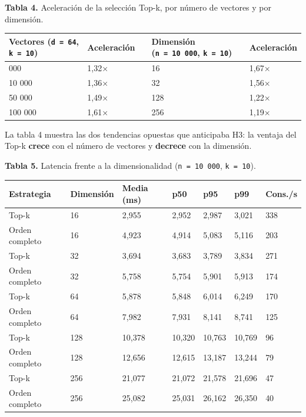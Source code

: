 \documentclass[11pt,a4paper]{article}
\begin{document}
\textbf{Tabla 4.} Aceleración de la selección Top-k, por número de
vectores y por dimensión.

\begin{longtable}[]{@{}C{0.21\textwidth}C{0.14\textwidth}C{0.03\textwidth}C{0.25\textwidth}C{0.14\textwidth}@{}}
\toprule\noalign{}
Vectores (\texttt{d\ =\ 64}, \texttt{k\ =\ 10}) & Aceleración & &
Dimensión (\texttt{n\ =\ 10\ 000}, \texttt{k\ =\ 10}) & Aceleración \\
\midrule\noalign{}
\endhead
\bottomrule\noalign{}
 000 & 1,32× & & 16 & 1,67× \\
10 000 & 1,36× & & 32 & 1,56× \\
50 000 & 1,49× & & 128 & 1,22× \\
100 000 & 1,61× & & 256 & 1,19× \\
\end{longtable}

La tabla 4 muestra las dos tendencias opuestas que anticipaba H3: la
ventaja del Top-k \textbf{crece} con el número de vectores y
\textbf{decrece} con la dimensión.

\textbf{Tabla 5.} Latencia frente a la dimensionalidad
(\texttt{n\ =\ 10\ 000}, \texttt{k\ =\ 10}).

\begin{longtable}[]{@{}L{0.15\textwidth}*{6}{C{0.10\textwidth}}@{}}
\toprule\noalign{}
Estrategia & Dimensión & Media (ms) & p50 & p95 & p99 & Cons./s \\
\midrule\noalign{}
\endhead
\bottomrule\noalign{}
\endlastfoot
Top-k & 16 & 2,955 & 2,952 & 2,987 & 3,021 & 338 \\
Orden completo & 16 & 4,923 & 4,914 & 5,083 & 5,116 & 203 \\
Top-k & 32 & 3,694 & 3,683 & 3,789 & 3,834 & 271 \\
Orden completo & 32 & 5,758 & 5,754 & 5,901 & 5,913 & 174 \\
Top-k & 64 & 5,878 & 5,848 & 6,014 & 6,249 & 170 \\
Orden completo & 64 & 7,982 & 7,931 & 8,141 & 8,741 & 125 \\
Top-k & 128 & 10,378 & 10,320 & 10,763 & 10,769 & 96 \\
Orden completo & 128 & 12,656 & 12,615 & 13,187 & 13,244 & 79 \\
Top-k & 256 & 21,077 & 21,072 & 21,578 & 21,696 & 47 \\
Orden completo & 256 & 25,082 & 25,031 & 26,162 & 26,350 & 40 \\
\end{longtable}
\end{document}
